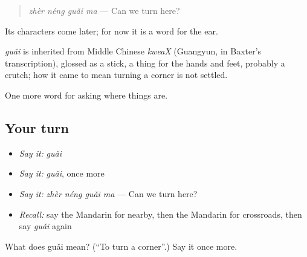 \begin{quote}
\emph{zhèr néng guǎi ma} — Can we turn here?
\end{quote}

Its characters come later; for now it is a word for the ear.

\begin{cousinweb}
\emph{guǎi} is inherited from Middle Chinese \emph{kweaX} (Guangyun, in Baxter's transcription), glossed as a stick, a thing for the hands and feet, probably a crutch; how it came to mean turning a corner is not settled.
\end{cousinweb}

\begin{grammarlens}[title={What you've built}]
One more word for asking where things are.
\end{grammarlens}

\subsection*{Your turn}
\begin{itemize}
\raggedright
  \item \emph{Say it:} \emph{guǎi}
  \item \emph{Say it:} \emph{guǎi}, once more
  \item \emph{Say it:} \emph{zhèr néng guǎi ma} — Can we turn here?
  \item \emph{Recall:} say the Mandarin for nearby, then the Mandarin for crossroads, then say \emph{guǎi} again
\end{itemize}

\begin{tcolorbox}[breakable,colback=teal!4,colframe=teal!35!black,title={Before you move on}]
What does guǎi mean? (\textquotedblleft{}To turn a corner\textquotedblright{}.) Say it once more.
\end{tcolorbox}
